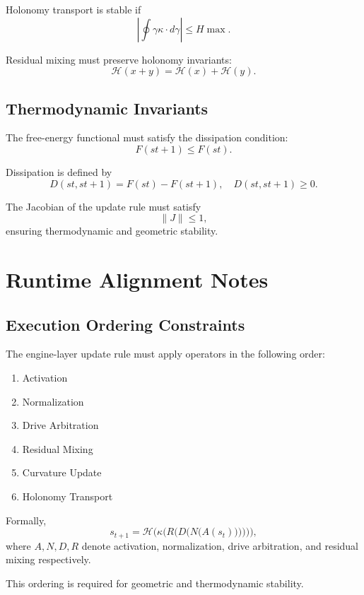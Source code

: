 Holonomy transport is stable if
\[
\left|\oint{\gamma} \kappa \cdot d\gamma\right| \le H{\max}.
\]

Residual mixing must preserve holonomy invariants:
\[
\mathcal{H}(x + y) = \mathcal{H}(x) + \mathcal{H}(y).
\]

\subsection{Thermodynamic Invariants}

The free-energy functional must satisfy the dissipation condition:
\[
F(s{t+1}) \le F(st).
\]

Dissipation is defined by
\[
D(st, s{t+1}) = F(st) - F(s{t+1}),
\quad D(st, s{t+1}) \ge 0.
\]

The Jacobian of the update rule must satisfy
\[
\|J\| \le 1,
\]
ensuring thermodynamic and geometric stability.

\section{Runtime Alignment Notes}

\subsection{Execution Ordering Constraints}

The engine-layer update rule must apply operators in the following order:
\begin{enumerate}
    \item Activation
    \item Normalization
    \item Drive Arbitration
    \item Residual Mixing
    \item Curvature Update
    \item Holonomy Transport
\end{enumerate}

Formally,
\[
s_{t+1} =
\mathcal{H}\Big(
    \kappa\big(
        R\big(
            D\big(
                N\big(
                    A(s_t)
                \big)
            \big)
        \big)
    \big)
\Big),
\]
where $A, N, D, R$ denote activation, normalization, drive arbitration, and
residual mixing respectively.

This ordering is required for geometric and thermodynamic stability.

